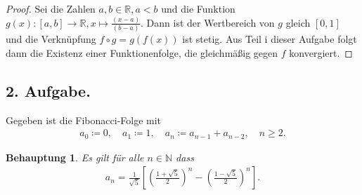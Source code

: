 \documentclass[draft,a5paper]{article}
\newtheorem*{beh}{Behauptung}
\begin{document}
\begin{proof}
  Sei die Zahlen \(a, b \in \mathbb{R}, a < b\) und die Funktion
  \(g(x) \colon [a, b] \to \mathbb{R}, x \mapsto \frac{(x-a)}{(b-a)}\).  Dann
  ist der Wertbereich von \(g\) gleich \([0, 1]\) und die Verknüpfung
  \(f \circ g = g(f(x))\) ist stetig.  Aus Teil i dieser Aufgabe folgt
  dann die Existenz einer Funktionenfolge, die gleichmäßig gegen \(f\)
  konvergiert.
\end{proof}

\subsection*{2. Aufgabe.}

Gegeben ist die Fibonacci-Folge mit
\begin{align*}
  a_0 \coloneq 0, \quad a_1 \coloneq 1, \quad a_n \coloneq a_{n-1} + a_{n-2}, \quad n \ge 2.
\end{align*}

\begin{beh}
  Es gilt für alle \(n \in \mathbb{N}\) dass
  \begin{align*}
    a_n = \frac{1}{\sqrt{5}}
    \left[ \left( \frac{1 + \sqrt{5}}{2} \right)^{n}
    - \left( \frac{1 - \sqrt{5}}{2} \right)^n \right].
  \end{align*}
\end{beh}
\end{document}
